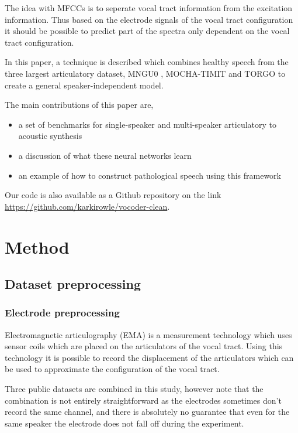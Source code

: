 \documentclass[a4paper]{article}
\begin{document}
The idea with MFCCs is to seperate vocal tract information from the excitation
information. Thus based on the electrode signals of the vocal tract configuration
it should be possible to predict part of the spectra only dependent on the vocal
tract configuration.

In this paper, a technique is described which combines healthy speech from the three largest articulatory dataset, MNGU0 \cite{Richmond2011}, MOCHA-TIMIT and TORGO \cite{Rudzicz2012} to create a general speaker-independent model. 

The main contributions of this paper are,
\begin{itemize}
\item a set of benchmarks for single-speaker and multi-speaker articulatory to acoustic synthesis
\item a discussion of what these neural networks learn
\item an example of how to construct pathological speech using this framework
\end{itemize}

Our code is also available as a Github repository on the link
\url{https://github.com/karkirowle/vocoder-clean}.

\section{Method}
\subsection{Dataset preprocessing}

\subsubsection{Electrode preprocessing}

Electromagnetic articulography (EMA) is a measurement technology which uses
sensor coils which are placed on the articulators of the vocal tract.
Using this technology it is possible to record the displacement of the articulators
which can be used to approximate the configuration of the vocal tract.

Three public datasets are combined in this study, however note that the combination is not
entirely straightforward as the electrodes sometimes don't record the same channel, and there is absolutely no guarantee that even for the same speaker the electrode does not fall off during the experiment.
\end{document}
